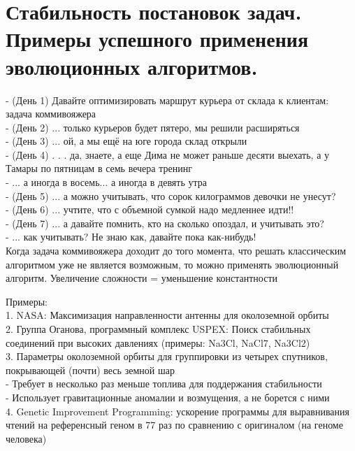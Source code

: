 \section{Стабильность постановок задач. Примеры успешного применения эволюционных алгоритмов.}

- (День 1) Давайте оптимизировать маршрут курьера от склада к клиентам: задача коммивояжера\\
- (День 2) ... только курьеров будет пятеро, мы решили расширяться\\
- (День 3) ... ой, а мы ещё на юге города склад открыли\\
- (День 4) . . . да, знаете, а еще Дима не может раньше десяти выехать, а у Тамары по пятницам в семь вечера тренинг\\
- ... а иногда в восемь... а иногда в девять утра\\
- (День 5) ... а можно учитывать, что сорок килограммов девочки не унесут? \\
- (День 6) ... учтите, что с объемной сумкой надо медленнее идти!!\\
- (День 7) ... а давайте помнить, кто на сколько опоздал, и учитывать это?\\
- ... как учитывать? Не знаю как, давайте пока как-нибудь!\\

Когда задача коммивояжера доходит до того момента, что решать классическим алгоритмом уже не является возможным, то можно применять эволюционный алгоритм. 
Увеличение сложности = уменьшение константности 

Примеры:\\
1. NASA: Максимизация направленности антенны для околоземной орбиты\\
2. Группа Оганова, программный комплекс USPEX: Поиск стабильных соединений при высоких давлениях (примеры: Na3Cl, NaCl7, Na3Cl2)\\
3. Параметры околоземной орбиты для группировки из четырех спутников, покрывающей (почти) весь земной шар \\
    - Требует в несколько раз меньше топлива для поддержания стабильности\\
    - Использует гравитационные аномалии и возмущения, а не борется с ними\\
4. Genetic Improvement Programming: ускорение программы для выравнивания чтений на референсный геном в 77 раз по сравнению с оригиналом (на геноме человека)\\
